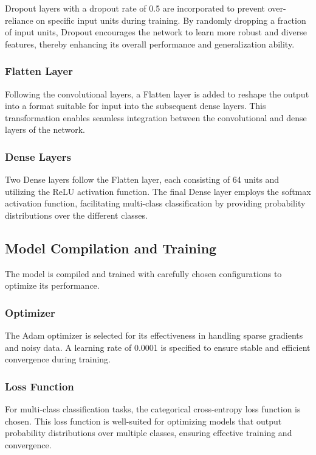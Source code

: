 Dropout layers with a dropout rate of 0.5 are incorporated to prevent over-reliance on specific input units during training. By randomly dropping a fraction of input units, Dropout encourages the network to learn more robust and diverse features, thereby enhancing its overall performance and generalization ability.

\subsubsection{Flatten Layer}

Following the convolutional layers, a Flatten layer is added to reshape the output into a format suitable for input into the subsequent dense layers. This transformation enables seamless integration between the convolutional and dense layers of the network.

\subsubsection{Dense Layers}

Two Dense layers follow the Flatten layer, each consisting of 64 units and utilizing the ReLU activation function. The final Dense layer employs the softmax activation function, facilitating multi-class classification by providing probability distributions over the different classes.

\subsection{Model Compilation and Training}

The model is compiled and trained with carefully chosen configurations to optimize its performance.

\subsubsection{Optimizer}

The Adam optimizer is selected for its effectiveness in handling sparse gradients and noisy data. A learning rate of 0.0001 is specified to ensure stable and efficient convergence during training.

\subsubsection{Loss Function}

For multi-class classification tasks, the categorical cross-entropy loss function is chosen. This loss function is well-suited for optimizing models that output probability distributions over multiple classes, ensuring effective training and convergence.


